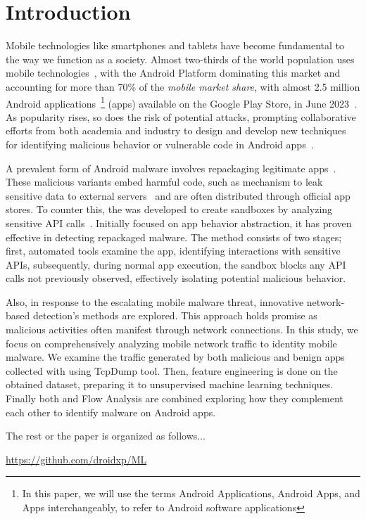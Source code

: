 \section{Introduction}\label{sec:introduction}

Mobile technologies like smartphones and tablets have become fundamental to the way we function as a society. Almost two-thirds of the world population uses mobile technologies~\cite{Comscore,DBLP:journals/tse/MartinSJZH17}, with the
Android Platform dominating this market and accounting for more than 70\% of the \emph{mobile market share}, with almost 2.5 million Android applications~\footnote{In this paper, we will use the terms Android Applications, Android Apps, and Apps interchangeably, to refer to Android software applications} (apps) available on the Google Play Store, in June 2023~\cite{Statista}.  
As popularity rises, so does the risk of potential attacks, prompting collaborative efforts from both academia and industry to design and develop new techniques for identifying malicious behavior or vulnerable code in Android apps~\cite{10.1145/3017427}.

A prevalent form of Android malware involves repackaging legitimate apps~\cite{DBLP:conf/wcre/BaoLL18, le2018towards}. These malicious variants embed harmful code, such as mechanism to leak sensitive data to external servers~\cite{DBLP:journals/tse/LiBK21} and are often distributed through official app stores. To counter this, the \mas was developed to create sandboxes by analyzing sensitive API calls~\cite{DBLP:conf/icse/JamrozikSZ16}. Initially focused on app behavior abstraction, it has proven effective in detecting repackaged malware. The method consists of two stages; first, automated tools examine the app, identifying interactions with sensitive APIs, subsequently, during normal app execution, the sandbox blocks any API calls not previously observed, effectively isolating potential malicious behavior.

Also, in response to the escalating mobile malware threat, innovative network-based detection's methods are explored. This approach holds promise as malicious activities often manifest through network connections. In this study, we focus on comprehensively analyzing mobile network traffic to identity mobile malware. We examine the traffic generated by both malicious and benign apps collected with \droidxp using TcpDump tool. Then, feature engineering is done on the obtained dataset, preparing it to unsupervised machine learning techniques. Finally both \mas and Flow Analysis are combined exploring how they complement each other to identify malware on Android apps.

The rest or the paper is organized as follows...

\begin{small}
  \begin{center}
    \url{https://github.com/droidxp/ML}
  \end{center}
\end{small}


